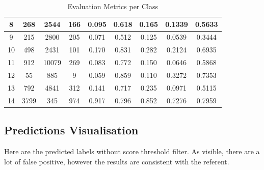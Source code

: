 \documentclass[12pt,oneside]{book} %
\begin{document}
\begin{table}[H]
\begin{tabular}{|c|c|c|c|c|c|c|c|c|}
        8              & 268         & 2544        & 166         & 0.095              & 0.618           & 0.165             & 0.1339       & 0.5633           \\ \hline
        9              & 215         & 2800        & 205         & 0.071              & 0.512           & 0.125             & 0.0539       & 0.3444           \\ \hline
        10             & 498         & 2431        & 101         & 0.170              & 0.831           & 0.282             & 0.2124       & 0.6935           \\ \hline
        11             & 912         & 10079       & 269         & 0.083              & 0.772           & 0.150             & 0.0646       & 0.5868           \\ \hline
        12             & 55          & 885         & 9           & 0.059              & 0.859           & 0.110             & 0.3272       & 0.7353           \\ \hline
        13             & 792         & 4841        & 312         & 0.141              & 0.717           & 0.235             & 0.0971       & 0.5115           \\ \hline
        14             & 3799        & 345         & 974         & 0.917              & 0.796           & 0.852             & 0.7276       & 0.7959           \\ \hline
    \end{tabular}
    \caption{Evaluation Metrics per Class}
    \label{tab:extended_metrics}
\end{table}

\newpage
\subsection{Predictions Visualisation}

Here are the predicted labels without score threshold filter. As visible, there
are a lot of false positive, however the results are consistent with the
referent.
\end{document}
